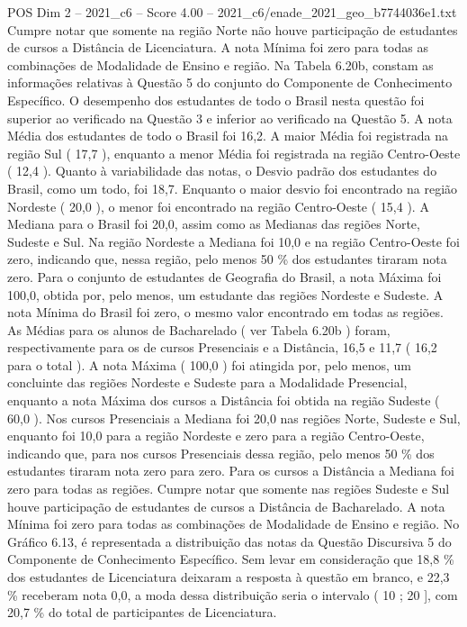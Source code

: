 \begin{textsample}{POS Dim 2 – 2021\_c6 – Score 4.00 – 2021\_c6/enade\_2021\_geo\_b7744036e1.txt}
Cumpre notar que somente na região Norte não houve participação de estudantes de cursos a Distância de Licenciatura.
A nota Mínima foi zero para todas as combinações de Modalidade de Ensino e região.
Na Tabela 6.20b, constam as informações relativas à Questão 5 do conjunto do Componente de Conhecimento Específico.
O desempenho dos estudantes de todo o Brasil nesta questão foi superior ao verificado na Questão 3 e inferior ao verificado na Questão 5.
A nota Média dos estudantes de todo o Brasil foi 16,2.
A maior Média foi registrada na região Sul ( 17,7 ), enquanto a menor Média foi registrada na região Centro-Oeste ( 12,4 ).
Quanto à variabilidade das notas, o Desvio padrão dos estudantes do Brasil, como um todo, foi 18,7.
Enquanto o maior desvio foi encontrado na região Nordeste ( 20,0 ), o menor foi encontrado na região Centro-Oeste ( 15,4 ).
A Mediana para o Brasil foi 20,0, assim como as Medianas das regiões Norte, Sudeste e Sul.
Na região Nordeste a Mediana foi 10,0 e na região Centro-Oeste foi zero, indicando que, nessa região, pelo menos 50 \% dos estudantes tiraram nota zero.
Para o conjunto de estudantes de Geografia do Brasil, a nota Máxima foi 100,0, obtida por, pelo menos, um estudante das regiões Nordeste e Sudeste.
A nota Mínima do Brasil foi zero, o mesmo valor encontrado em todas as regiões.
As Médias para os alunos de Bacharelado ( ver Tabela 6.20b ) foram, respectivamente para os de cursos Presenciais e a Distância, 16,5 e 11,7 ( 16,2 para o total ).
A nota Máxima ( 100,0 ) foi atingida por, pelo menos, um concluinte das regiões Nordeste e Sudeste para a Modalidade Presencial, enquanto a nota Máxima dos cursos a Distância foi obtida na região Sudeste ( 60,0 ).
Nos cursos Presenciais a Mediana foi 20,0 nas regiões Norte, Sudeste e Sul, enquanto foi 10,0 para a região Nordeste e zero para a região Centro-Oeste, indicando que, para nos cursos Presenciais dessa região, pelo menos 50 \% dos estudantes tiraram nota zero para zero.
Para os cursos a Distância a Mediana foi zero para todas as regiões.
Cumpre notar que somente nas regiões Sudeste e Sul houve participação de estudantes de cursos a Distância de Bacharelado.
A nota Mínima foi zero para todas as combinações de Modalidade de Ensino e região.
No Gráfico 6.13, é representada a distribuição das notas da Questão Discursiva 5 do Componente de Conhecimento Específico.
Sem levar em consideração que 18,8 \% dos estudantes de Licenciatura deixaram a resposta à questão em branco, e 22,3 \% receberam nota 0,0, a moda dessa distribuição seria o intervalo ( 10 ; 20 ], com 20,7 \% do total de participantes de Licenciatura.

\end{textsample}
